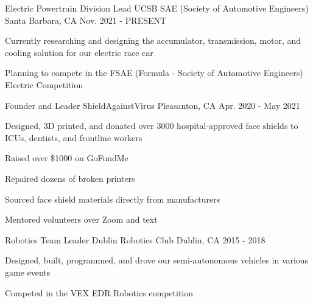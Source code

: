 


\begin{cventries}

\cventry
{Electric Powertrain Division Lead} %
{UCSB SAE (Society of Automotive Engineers)} %
{Santa Barbara, CA} %
{Nov. 2021 - PRESENT} %
{ %
\begin{cvitems}
\item {Currently researching and designing the accumulator, transmission, motor, and cooling solution for our electric race car}
\item {Planning to compete in the FSAE (Formula - Society of Automotive Engineers) Electric Competition}
\end{cvitems}
}


\cventry
{Founder and Leader} %
{ShieldAgainstVirus} %
{Pleasanton, CA} %
{Apr. 2020 - May 2021} %
{ %
\begin{cvitems}
\item {Designed, 3D printed, and donated over 3000 hospital-approved face shields to ICUs, dentists, and frontline workers}
\item {Raised over \$1000 on GoFundMe}
\item {Repaired dozens of broken printers}
\item {Sourced face shield materials directly from manufacturers}
\item {Mentored volunteers over Zoom and text}
\end{cvitems}
}




\cventry
{Robotics Team Leader} %
{Dublin Robotics Club} %
{Dublin, CA} %
{2015 - 2018} %
{ %
\begin{cvitems}
\item {Designed, built, programmed, and drove our semi-autonomous vehicles in various game events}
\item {Competed in the VEX EDR Robotics competition}
\end{cvitems}
}


\end{cventries}
